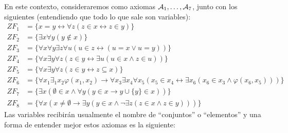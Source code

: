 En este contexto, consideraremos como axiomas $\mathcal{A}_1,\ldots,\mathcal{A}_7$, junto con los siguientes (entendiendo que todo lo que sale son variables):
\begin{align*}
    ZF_1 &= \{x=y \leftrightarrow \forall z(z\in x \leftrightarrow z\in y)\} \\
    ZF_2 &= \{\exists x\forall y(y\notin x) \} \\
    ZF_3 &= \{\forall x\forall y\exists z\forall u(u\in z\leftrightarrow (u=x\lor u=y))\} \\
    ZF_4 &= \{\forall x\exists y\forall z(z\in y\leftrightarrow \exists u(u\in x\land z\in u))\} \\
    ZF_5 &= \{\forall x\exists y\forall z(z\in y\leftrightarrow z\subseteq x)\} \\
    ZF_6 &= \{\forall x_1\exists_1x_2\varphi(x_1,x_2)\to \forall x_3\exists x_4\forall x_5(x_5\in x_4\leftrightarrow \exists x_6(x_6\in x_3\land \varphi(x_6,x_5)))\} \\
    ZF_7 &= \{\exists x(\emptyset \in x\land \forall y(y\in x\to y\cup \{y\}\in x))\} \\
    ZF_8 &= \{\forall x(x\neq \emptyset \to \exists y(y\in x\land \lnot\exists z(z\in x\land z\in y)))\}
\end{align*}
Las variables recibirán usualmente el nombre de ``conjuntos'' o ``elementos'' y una forma de entender mejor estos axiomas es la siguiente:
